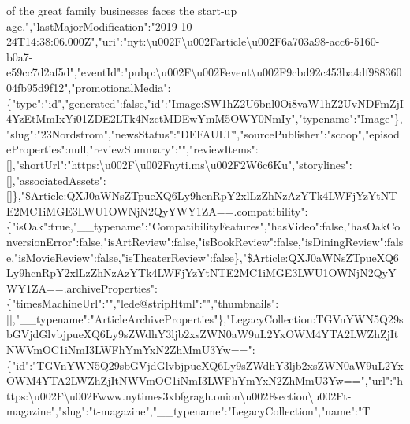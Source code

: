 of the great family businesses faces the start-up
age.","lastMajorModification":"2019-10-24T14:38:06.000Z","uri":"nyt:\textbackslash{}u002F\textbackslash{}u002Farticle\textbackslash{}u002F6a703a98-acc6-5160-b0a7-e59cc7d2af5d","eventId":"pubp:\textbackslash{}u002F\textbackslash{}u002Fevent\textbackslash{}u002F9cbd92c453ba4df98836004fb95d9f12","promotionalMedia":\{"type":"id","generated":false,"id":"Image:SW1hZ2U6bnl0Oi8vaW1hZ2UvNDFmZjI4YzEtMmIxYi01ZDE2LTk4NzctMDEwYmM5OWY0NmIy","typename":"Image"\},"slug":"23Nordstrom","newsStatus":"DEFAULT","sourcePublisher":"scoop","episodeProperties":null,"reviewSummary":"","reviewItems":{[}{]},"shortUrl":"https:\textbackslash{}u002F\textbackslash{}u002Fnyti.ms\textbackslash{}u002F2W6c6Ku","storylines":{[}{]},"associatedAssets":{[}{]}\},"\$Article:QXJ0aWNsZTpueXQ6Ly9hcnRpY2xlLzZhNzAzYTk4LWFjYzYtNTE2MC1iMGE3LWU1OWNjN2QyYWY1ZA==.compatibility":\{"isOak":true,"\_\_typename":"CompatibilityFeatures","hasVideo":false,"hasOakConversionError":false,"isArtReview":false,"isBookReview":false,"isDiningReview":false,"isMovieReview":false,"isTheaterReview":false\},"\$Article:QXJ0aWNsZTpueXQ6Ly9hcnRpY2xlLzZhNzAzYTk4LWFjYzYtNTE2MC1iMGE3LWU1OWNjN2QyYWY1ZA==.archiveProperties":\{"timesMachineUrl":"","lede@stripHtml":"","thumbnails":{[}{]},"\_\_typename":"ArticleArchiveProperties"\},"LegacyCollection:TGVnYWN5Q29sbGVjdGlvbjpueXQ6Ly9sZWdhY3ljb2xsZWN0aW9uL2YxOWM4YTA2LWZhZjItNWVmOC1iNmI3LWFhYmYxN2ZhMmU3Yw==":\{"id":"TGVnYWN5Q29sbGVjdGlvbjpueXQ6Ly9sZWdhY3ljb2xsZWN0aW9uL2YxOWM4YTA2LWZhZjItNWVmOC1iNmI3LWFhYmYxN2ZhMmU3Yw==","url":"https:\textbackslash{}u002F\textbackslash{}u002Fwww.nytimes3xbfgragh.onion\textbackslash{}u002Fsection\textbackslash{}u002Ft-magazine","slug":"t-magazine","\_\_typename":"LegacyCollection","name":"T
